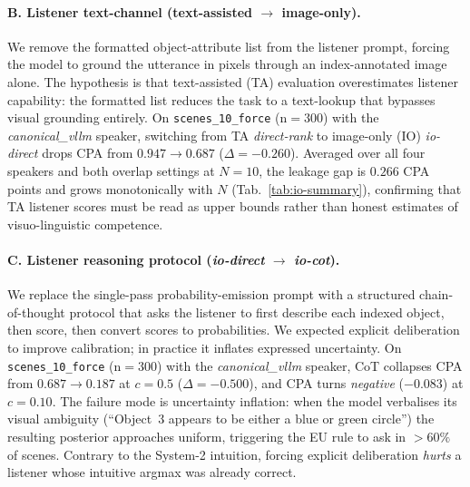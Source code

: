 \paragraph{B. Listener text-channel
            (text-assisted $\to$ image-only).}
We remove the formatted object-attribute list from the listener prompt,
forcing the model to ground the utterance in pixels through an
index-annotated image alone.
The hypothesis is that text-assisted (TA) evaluation overestimates
listener capability: the formatted list reduces the task to a
text-lookup that bypasses visual grounding entirely.
On \texttt{scenes\_10\_force} (n${=}300$) with the
\textit{canonical\_vllm} speaker, switching from TA \textit{direct-rank}
to image-only (IO) \textit{io-direct} drops CPA from $0.947 \to 0.687$
($\Delta {=} {-}0.260$).
Averaged over all four speakers and both overlap settings at $N{=}10$,
the leakage gap is $0.266$ CPA points and grows monotonically with $N$
(Tab.~\ref{tab:io-summary}), confirming that TA listener scores must be
read as upper bounds rather than honest estimates of visuo-linguistic
competence.

\paragraph{C. Listener reasoning protocol
            (\textit{io-direct} $\to$ \textit{io-cot}).}
We replace the single-pass probability-emission prompt with a structured
chain-of-thought protocol that asks the listener to first describe each
indexed object, then score, then convert scores to probabilities.
We expected explicit deliberation to improve calibration; in practice it
inflates expressed uncertainty.
On \texttt{scenes\_10\_force} (n${=}300$) with the
\textit{canonical\_vllm} speaker, CoT collapses CPA from $0.687 \to
0.187$ at $c{=}0.5$ ($\Delta {=} {-}0.500$), and CPA turns
\emph{negative} ($-0.083$) at $c{=}0.10$.
The failure mode is uncertainty inflation: when the model verbalises its
visual ambiguity (``Object~3 appears to be either a blue or green
circle'') the resulting posterior approaches uniform, triggering the EU
rule to ask in $>{60}\%$ of scenes.  Contrary to the System-2 intuition,
forcing explicit deliberation \emph{hurts} a listener whose intuitive
argmax was already correct.

